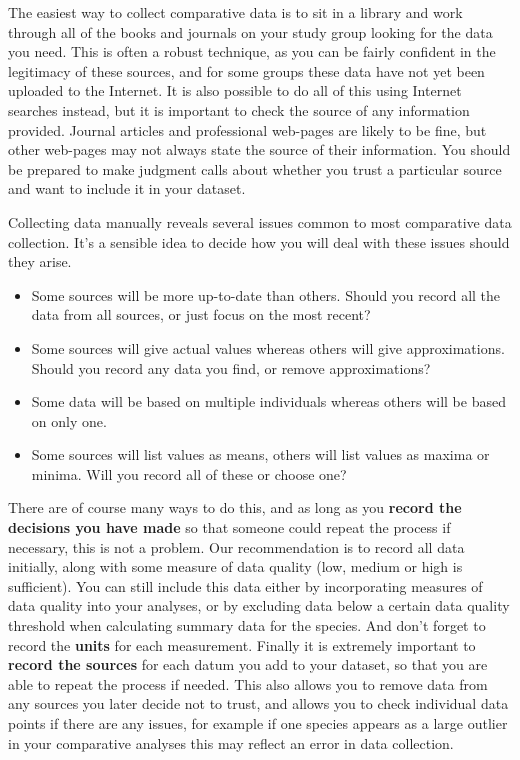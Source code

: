 \documentclass[]{book}
\providecommand{\tightlist}{%
  \setlength{\itemsep}{0pt}\setlength{\parskip}{0pt}}
\begin{document}
The easiest way to collect comparative data is to sit in a library and
work through all of the books and journals on your study group looking
for the data you need. This is often a robust technique, as you can be
fairly confident in the legitimacy of these sources, and for some groups
these data have not yet been uploaded to the Internet. It is also
possible to do all of this using Internet searches instead, but it is
important to check the source of any information provided. Journal
articles and professional web-pages are likely to be fine, but other
web-pages may not always state the source of their information. You
should be prepared to make judgment calls about whether you trust a
particular source and want to include it in your dataset.

Collecting data manually reveals several issues common to most
comparative data collection. It's a sensible idea to decide how you will
deal with these issues should they arise.

\begin{itemize}
\tightlist
\item
  Some sources will be more up-to-date than others. Should you record
  all the data from all sources, or just focus on the most recent?
\item
  Some sources will give actual values whereas others will give
  approximations. Should you record any data you find, or remove
  approximations?
\item
  Some data will be based on multiple individuals whereas others will be
  based on only one.
\item
  Some sources will list values as means, others will list values as
  maxima or minima. Will you record all of these or choose one?
\end{itemize}

There are of course many ways to do this, and as long as you
\textbf{record the decisions you have made} so that someone could repeat
the process if necessary, this is not a problem. Our recommendation is
to record all data initially, along with some measure of data quality
(low, medium or high is sufficient). You can still include this data
either by incorporating measures of data quality into your analyses, or
by excluding data below a certain data quality threshold when
calculating summary data for the species. And don't forget to record the
\textbf{units} for each measurement. Finally it is extremely important
to \textbf{record the sources} for each datum you add to your dataset,
so that you are able to repeat the process if needed. This also allows
you to remove data from any sources you later decide not to trust, and
allows you to check individual data points if there are any issues, for
example if one species appears as a large outlier in your comparative
analyses this may reflect an error in data collection.
\end{document}
